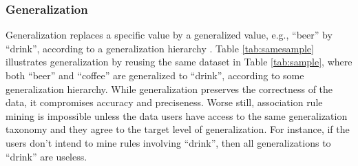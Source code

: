\subsubsection{Generalization}

Generalization replaces a specific value by
a generalized value, e.g., ``beer'' by ``drink'',
according to a generalization hierarchy \cite{FungWCY10:Survey}.
Table \ref{tab:samesample} illustrates generalization by reusing the
same dataset in Table \ref{tab:sample}, where both ``beer'' and ``coffee''
are generalized to ``drink'', according to some generalization hierarchy.
While generalization preserves the correctness of the data,
it compromises accuracy
and preciseness. Worse still, association rule mining is impossible
unless the data users have access to the same generalization taxonomy
and they agree to the target level of generalization. For instance, if
the users don't intend to mine rules involving ``drink'', then
all generalizations to ``drink'' are useless.

\begin{table*}[thb]
\caption{The Same Dataset in Table \ref{tab:sample} and Generalization Anonymization Result
\label{tab:samesample}}
\centering
{}

\end{table*}

